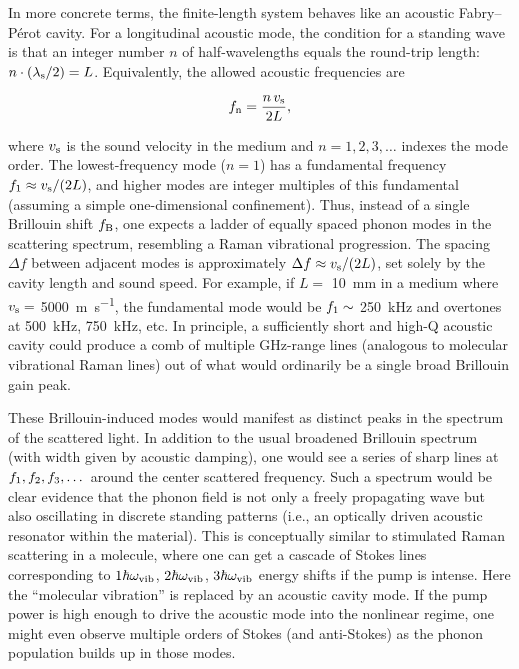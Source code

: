In more concrete terms, the finite-length system behaves like an acoustic Fabry–Pérot cavity. For a longitudinal acoustic mode, the condition for a standing wave is that an integer number \(n\) of half-wavelengths equals the round-trip length: \(n \cdot (\lambda_{\rm s}/2) = L\). Equivalently, the allowed acoustic frequencies are

\begin{equation}
f_{\rm n} = \frac{n\,v_{\rm s}}{2L},
\end{equation}

where \(v_{\rm s}\) is the sound velocity in the medium and \(n = 1, 2, 3, \dots\) indexes the mode order. The lowest-frequency mode (\(n = 1\)) has a fundamental frequency \(f_{\rm 1} \approx v_{\rm s}/(2L)\), and higher modes are integer multiples of this fundamental (assuming a simple one-dimensional confinement). Thus, instead of a single Brillouin shift \(f_{\rm B}\), one expects a ladder of equally spaced phonon modes in the scattering spectrum, resembling a Raman vibrational progression. The spacing \(\Delta f\) between adjacent modes is approximately \(\Delta f \approx v_{\rm s}/(2L)\), set solely by the cavity length and sound speed. For example, if \(L =\) \SI{10}{\milli\meter} in a medium where \(v_{\rm s} =\) \SI{5000}{\meter\per\second}, the fundamental mode would be \(f_{\rm 1} \sim\) \SI{250}{\kilo\hertz} and overtones at \SI{500}{\kilo\hertz}, \SI{750}{\kilo\hertz}, etc. In principle, a sufficiently short and high-Q acoustic cavity could produce a comb of multiple \si{\giga\hertz}-range lines (analogous to molecular vibrational Raman lines) out of what would ordinarily be a single broad Brillouin gain peak.

These Brillouin-induced modes would manifest as distinct peaks in the spectrum of the scattered light. In addition to the usual broadened Brillouin spectrum (with width given by acoustic damping), one would see a series of sharp lines at \(f_{\rm 1}, f_{\rm 2}, f_{\rm 3}, \dots\) around the center scattered frequency. Such a spectrum would be clear evidence that the phonon field is not only a freely propagating wave but also oscillating in discrete standing patterns (i.e., an optically driven acoustic resonator within the material). This is conceptually similar to stimulated Raman scattering in a molecule, where one can get a cascade of Stokes lines corresponding to \(1\hbar\omega_{\rm vib}\), \(2\hbar\omega_{\rm vib}\), \(3\hbar\omega_{\rm vib}\) energy shifts if the pump is intense. Here the “molecular vibration” is replaced by an acoustic cavity mode. If the pump power is high enough to drive the acoustic mode into the nonlinear regime, one might even observe multiple orders of Stokes (and anti-Stokes) as the phonon population builds up in those modes.

